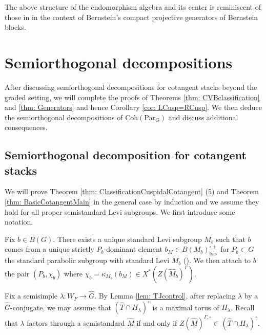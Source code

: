 \documentclass{amsart}
\theoremstyle{definition}
\theoremstyle{remark}
\numberwithin{equation}{section}
\newcommand{\bas}{\mathrm{bas}}
\newcommand{\wh}{\widehat}
\newcommand{\Par}{\mathrm{Par}}
\newcommand{\Coh}{\mathrm{Coh}}
\begin{document}
The above structure of the endomorphism algebra and its center is reminiscent of those in \cite{BernsteinRumelhart} in the context of Bernstein's compact projective generators of Bernstein blocks. 

\section{Semiorthogonal decompositions}{\label{s: SODs}}
After discussing semiorthogonal decompositions for cotangent stacks beyond the graded setting, we will complete the proofs of Theorems \ref{thm: CVBclassification} and \ref{thm: Generators} and hence Corollary \ref{cor: LCusp=RCusp}. We then deduce the semiorthogonal decompositions of $\Coh(\Par_G)$ and discuss additional consequences. 

\subsection{Semiorthogonal decomposition for cotangent stacks}{\label{ss: SODcotangent}}
We will prove Theorem \ref{thm: ClassificationCuspidalCotangent} (5) and Theorem \ref{thm: BasicCotangentMain} in the general case by induction and we assume they hold for all proper semistandard Levi subgroups. We first introduce some notation. 

Fix $b\in B(G)$. There exists a unique standard Levi subgroup $M_b$ such that $b$ comes from a unique strictly $P_b$-dominant element $b_M \in B(M_b)^{\circ +}_{\bas}$ for $P_b \subset G$ the standard parabolic subgroup with standard Levi $M_b$ (\cite[\S5.1]{KottwitzisoII}). We then attach to $b$ the pair $(P_b, \chi_b)$ where $\chi_b = \kappa_{M_b}(b_M) \in X^{\ast}(Z(\wh{M}_b)^{\Gamma})$. 

Fix a semisimple $\lambda\colon W_F\to \wh G$. By Lemma \ref{lem: TJcontrol}, after replacing $\lambda$ by a $\wh G$-conjugate, we may assume that $(\wh T \cap H_\lambda)^\circ$ is a maximal torus of $H_\lambda$. Recall that $\lambda$ factors through a semistandard $\wh M$ if and only if $Z(\wh M)^{\Gamma,\circ}\subset (\wh T \cap H_\lambda)^\circ$. 
\end{document}
